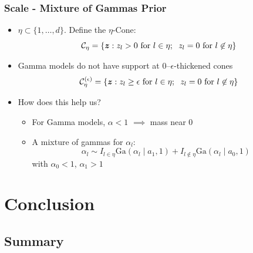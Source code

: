 \documentclass[aspectratio=169]{beamer}
\begin{document}
\begin{frame}
  \frametitle{Scale - Mixture of Gammas Prior}
  \begin{itemize}
    \item $\eta \subset \lbrace 1,\ldots,d\rbrace$.  Define the $\eta$-Cone:
      \begin{equation*}
        \mathcal{C}_{\eta} = \left\lbrace \bm{z} : z_l > 0 \text{ for }l\in\eta;
                              \hspace{0.2cm} z_l = 0 \text{ for }l\not\in\eta\right\rbrace
      \end{equation*}
    \pause
    \item Gamma models do not have support at 0--$\epsilon$-thickened cones
      \begin{equation*}
        \mathcal{C}_{\eta}^{(\epsilon)} = \left\lbrace \bm{z} : z_l \geq \epsilon
          \text{ for }l\in\eta; \hspace{0.2cm} z_l = 0 \text{ for }l\not\in\eta\right\rbrace
      \end{equation*}
    \pause
    \item How does this help us?
      \begin{itemize}
        \item For Gamma models, $\alpha < 1$ $\implies$ mass near 0
        \item A mixture of gammas for $\alpha_l$:
          \begin{equation*}
            \alpha_l \sim I_{l\in\eta}\text{Ga}(\alpha_l\mid a_1, 1)
                        + I_{l\not\in\eta}\text{Ga}(\alpha_l\mid a_0, 1)
          \end{equation*}
          with $\alpha_0 < 1$, $\alpha_1 > 1$
      \end{itemize}
  \end{itemize}
\end{frame}

\section{Conclusion}

\subsection{Summary}
\end{document}
